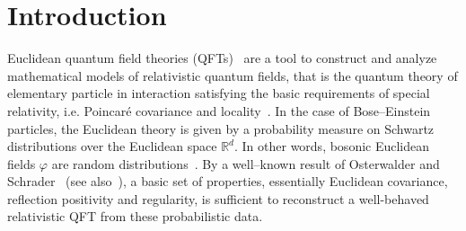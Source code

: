 \documentclass{article}
\begin{document}
{\tableofcontents}

\section{Introduction}

Euclidean quantum field theories
(QFTs)~{\cite{simon_po2_1974,glimm_quantum_1987,rivasseau_perturbative_1991}}
are a tool to construct and analyze mathematical models of relativistic
quantum fields, that is the quantum theory of elementary particle in
interaction satisfying the basic requirements of special relativity, i.e.
Poincar{\'e} covariance and
locality~{\cite{MR0277208,streater_pct_2000,jost_general_1965,bogolubov_general_1990,Haag1,Segalbook,MR1799198,strocchi_introduction_2013,friedrichs_mathematical_1953}}.
In the case of Bose--Einstein particles, the Euclidean theory is given by a
probability measure on Schwartz distributions over the Euclidean space
$\mathbb{R}^d$. In other words, bosonic Euclidean fields $\varphi$ are random
distributions~{\cite{symanzik,nelson_construction_1973,MR1340626}}. By a
well--known result of Osterwalder and Schrader~{\cite{glimm_quantum_1987}}
(see also~{\cite{zinoviev_equivalence_1995}}), a basic set of properties,
essentially Euclidean covariance, reflection positivity and regularity, is
sufficient to reconstruct a well-behaved relativistic QFT from these
probabilistic data.
\end{document}
